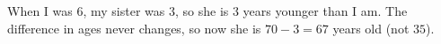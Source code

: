 When I was $6$, my sister was $3$, so she is $3$ years younger than I am. The difference in ages never changes, so now she is $70-3=\boxed{67}$ years old (not $35$).

